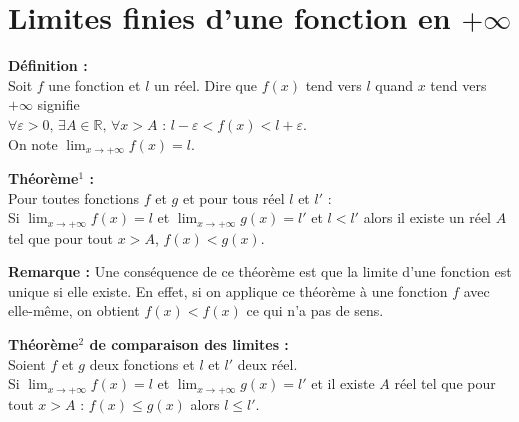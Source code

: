 \documentclass[11pt,a4paper]{article}
\title{\doctitre}
\author{\docniveau \\ \doctheme\text{ - }\doctype}
\date{}
\begin{document}
\maketitle
\pagestyle{custom}
\thispagestyle{custom}

\section{Limites finies d'une fonction en $+\infty$}



\begin{mdframed}[style=definitionStyle]
    \textbf{Définition :} ~\\
    Soit $f$ une fonction et $l$ un réel.
    Dire que \guillemotleft $f(x)$ tend vers $l$ quand $x$ tend vers $+\infty$ \guillemotright\text{ }signifie \\
    $\forall \varepsilon > 0\text{, } \exists A\in\mathbb{R}\text{, } \forall x>A\text{ : } l-\varepsilon < f(x) < l+\varepsilon$. \\
    On note $\displaystyle \lim_{x \to +\infty} f(x) = l$.
\end{mdframed}

\begin{mdframed}[style=proprieteStyle]
    \textbf{Théorème$^{1}$ :} ~\\
    Pour toutes fonctions $f$ et $g$ et pour tous réel $l$ et $l'$ : \\
    Si $\displaystyle\lim_{x \to +\infty} f(x) = l$ et $\displaystyle\lim_{x \to +\infty} g(x) = l'$ et $l<l'$ alors
    il existe un réel $A$ tel que pour tout $x>A$, $f(x)<g(x)$.
\end{mdframed}

\textbf{Remarque :} Une conséquence de ce théorème est que la limite d'une fonction est unique si elle existe. En effet,
si on applique ce théorème à une fonction $f$ avec elle-même, on obtient $f(x)<f(x)$ ce qui n'a pas de sens.

\begin{mdframed}[style=proprieteStyle]
    \textbf{Théorème$^{2}$ de comparaison des limites :} ~\\
    Soient $f$ et $g$ deux fonctions et $l$ et $l'$ deux réel. \\
    Si $\displaystyle\lim_{x \to +\infty} f(x) = l$ et $\displaystyle\lim_{x \to +\infty} g(x) = l'$ et il existe $A$ réel
    tel que pour tout $x>A$ : $f(x)\leq g(x)$ alors $l\leq l'$.
\end{mdframed}
\end{document}
